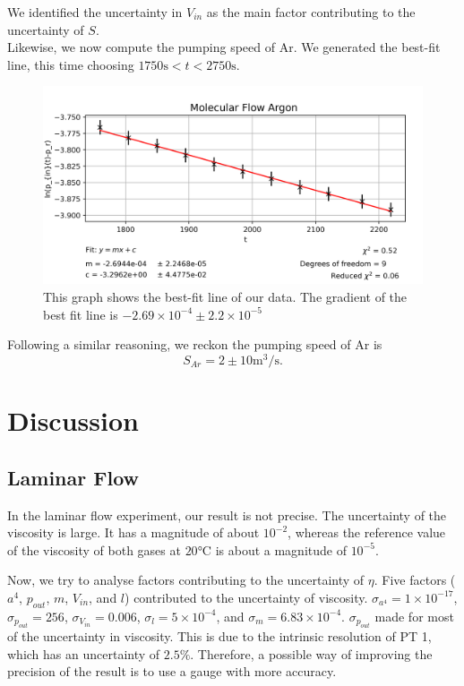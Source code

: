 \documentclass[12pt,a4paper]{article}
\begin{document}
  We identified the uncertainty in $V_{in}$ as the main factor contributing to the uncertainty of $S$.\\
  
  Likewise, we now compute the pumping speed of Ar. We generated the best-fit line, this time choosing $1750\si{\second}<t<2750\si{\second}$.
  \begin{figure}[h!]
		\begin{center}
		\includegraphics[scale=0.5]{Molecular_Argon.png}
		\caption{This graph shows the best-fit line of our data. The gradient of the best fit line is $-2.69 \times 10^{-4} \pm 2.2 \times 10^{-5}$}
		\end{center}
	\end{figure}
	
	Following a similar reasoning, we reckon the pumping speed of Ar is
	\begin{equation}
		S_{Ar}= 2 \pm 10 \si{\meter^3\per\second}.
	\end{equation}
	\section{Discussion}
	\subsection{Laminar Flow}
	In the laminar flow experiment, our result is not precise. The uncertainty of the viscosity is large. It has a magnitude of about $10^{-2}$, whereas the reference value of the viscosity of both gases at $20\si{\celsius}$ is about a magnitude of $10^{-5}$.
	
	Now, we try to analyse factors contributing to the uncertainty of $\eta$. Five factors ($a^4$, $p_{out}$, $m$, $V_{in}$, and $l$) contributed to the uncertainty of viscosity. $\sigma_{a^4}=1 \times 10^{-17}$, $\sigma_{p_{out}}=256$, $\sigma_{V_{in}}=0.006$, $\sigma_{l}=5 \times 10^{-4}$, and $\sigma_{m}=6.83 \times 10^{-4}$. $\sigma_{p_{out}}$ made for most of the uncertainty in viscosity. This is due to the intrinsic resolution of PT 1, which has an uncertainty of $2.5\%$. Therefore, a possible way of improving the precision of the result is to use a gauge with more accuracy.
	
\end{document}
